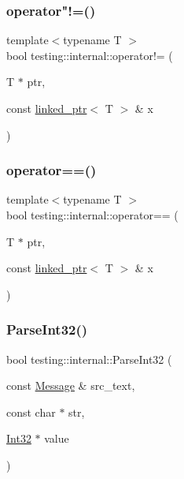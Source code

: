 \mbox{\label{namespacetesting_1_1internal_a6910869259f8f31825b471e9190fa09a}} 
\subsubsection{\texorpdfstring{operator"!=()}{operator!=()}}
{\footnotesize\ttfamily template$<$typename T $>$ \\
bool testing\+::internal\+::operator!= (\begin{DoxyParamCaption}\item[{T $\ast$}]{ptr,  }\item[{const \mbox{\hyperlink{classtesting_1_1internal_1_1linked__ptr}{linked\+\_\+ptr}}$<$ T $>$ \&}]{x }\end{DoxyParamCaption})\hspace{0.3cm}{\ttfamily [inline]}}

\mbox{\label{namespacetesting_1_1internal_ad1cb54a206a209ddace17a05359d38ae}} 
\subsubsection{\texorpdfstring{operator==()}{operator==()}}
{\footnotesize\ttfamily template$<$typename T $>$ \\
bool testing\+::internal\+::operator== (\begin{DoxyParamCaption}\item[{T $\ast$}]{ptr,  }\item[{const \mbox{\hyperlink{classtesting_1_1internal_1_1linked__ptr}{linked\+\_\+ptr}}$<$ T $>$ \&}]{x }\end{DoxyParamCaption})\hspace{0.3cm}{\ttfamily [inline]}}

\mbox{\label{namespacetesting_1_1internal_ac06fc81336a3d80755f4020d34321766}} 
\subsubsection{\texorpdfstring{ParseInt32()}{ParseInt32()}}
{\footnotesize\ttfamily bool testing\+::internal\+::\+Parse\+Int32 (\begin{DoxyParamCaption}\item[{const \mbox{\hyperlink{classtesting_1_1_message}{Message}} \&}]{src\+\_\+text,  }\item[{const char $\ast$}]{str,  }\item[{\mbox{\hyperlink{namespacetesting_1_1internal_a8ee38faaf875f133358abaf9bc056cec}{Int32}} $\ast$}]{value }\end{DoxyParamCaption})}

